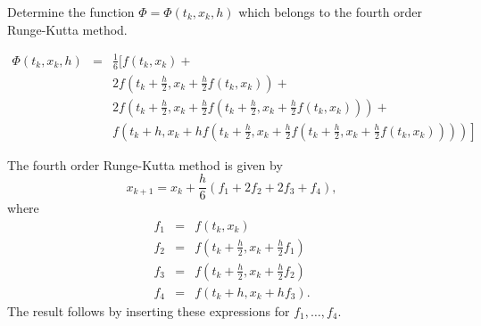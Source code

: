 \documentclass{ximera}
\begin{document}
\begin{exercise} \label{c15.3.1}
Determine the function $\Phi=\Phi(t_k,x_k,h)$ which belongs to the 
fourth order Runge-Kutta method.

\begin{solution}
\ans
\begin{eqnarray*}
\Phi(t_k,x_k,h) & = & \frac{1}{6}\Big[f(t_k,x_k)+\\
&&2f\left(t_k+\frac{h}{2},x_k+\frac{h}{2}f(t_k,x_k)\right) +\\
&&2f\left(t_k+\frac{h}{2},x_k+
  \frac{h}{2}f\left(t_k+\frac{h}{2},x_k+\frac{h}{2}f(t_k,x_k)\right)\right)+\\
&&\left.f\left(t_k+h,x_k+hf\left(t_k+\frac{h}{2},x_k+
  \frac{h}{2}f\left(t_k+\frac{h}{2},x_k+
  \frac{h}{2}f(t_k,x_k)\right)\right)\right)\right]
\end{eqnarray*}

\soln The fourth order Runge-Kutta method is given by
\[
x_{k+1} = x_k+\frac{h}{6}(f_1+2f_2+2f_3+f_4),
\]
where
\begin{eqnarray*}
f_1 &=& f(t_k,x_k)\\
f_2 &=& f\left(t_k+\frac{h}{2},x_k+\frac{h}{2}f_1\right)\\
f_3 &=& f\left(t_k+\frac{h}{2},x_k+\frac{h}{2}f_2\right)\\
f_4 &=& f(t_k+h,x_k+hf_3).
\end{eqnarray*}
The result follows by inserting these expressions for $f_1,\ldots,f_4$.

\end{solution}
\end{exercise}
\end{document}
